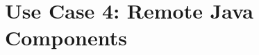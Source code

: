 \section{Use Case 4: Remote Java Components}
\label{section:RemoteJavaComponentImplementation}




\newpage